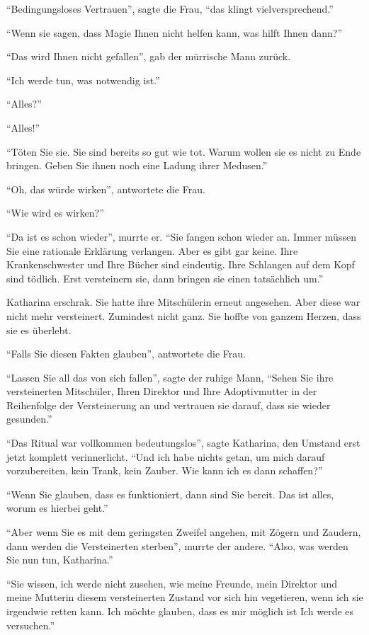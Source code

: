 \enquote{Bedingungsloses Vertrauen}, sagte die Frau, \enquote{das klingt vielversprechend.}

\enquote{Wenn sie sagen, dass Magie Ihnen nicht helfen kann, was hilft Ihnen dann?}

\enquote{Das wird Ihnen nicht gefallen}, gab der mürrische Mann zurück.

\enquote{Ich werde tun, was notwendig ist.}

\enquote{Alles?}

\enquote{Alles!}

\enquote{Töten Sie sie. Sie sind bereits so gut wie tot. Warum wollen sie es nicht zu Ende bringen. Geben Sie ihnen noch eine Ladung ihrer Medusen.}

\enquote{Oh, das würde wirken}, antwortete die Frau.

\enquote{Wie wird es wirken?}

\enquote{Da ist es schon wieder}, murrte er. \enquote{Sie fangen schon wieder an. Immer müssen Sie eine rationale Erklärung verlangen. Aber es gibt gar keine. Ihre Krankenschwester und Ihre Bücher sind eindeutig. Ihre Schlangen auf dem Kopf sind tödlich. Erst versteinern sie, dann bringen sie einen tatsächlich um.}

Katharina erschrak. Sie hatte ihre Mitschülerin erneut angesehen. Aber diese war nicht mehr versteinert. Zumindest nicht ganz. Sie hoffte von ganzem Herzen, dass sie es überlebt.

\enquote{Falls Sie diesen Fakten glauben}, antwortete die Frau.

\enquote{Lassen Sie all das von sich fallen}, sagte der ruhige Mann, \enquote{Sehen Sie ihre versteinerten Mitschüler, Ihren Direktor und Ihre Adoptivmutter in der Reihenfolge der Versteinerung an und vertrauen sie darauf, dass sie wieder gesunden.}

\enquote{Das Ritual war vollkommen bedeutungslos}, sagte Katharina, den Umstand erst jetzt komplett verinnerlicht. \enquote{Und ich habe nichts getan, um mich darauf vorzubereiten, kein Trank, kein Zauber. Wie kann ich es dann schaffen?}

\enquote{Wenn Sie glauben, dass es funktioniert, dann sind Sie bereit. Das ist alles, worum es hierbei geht.}

\enquote{Aber wenn Sie es mit dem geringsten Zweifel angehen, mit Zögern und Zaudern, dann werden die Versteinerten sterben}, murrte der andere. \enquote{\gst Also, was werden Sie nun tun, Katharina.}

\enquote{Sie wissen, ich werde nicht zusehen, wie meine Freunde, mein Direktor und meine Mutter\abs in diesem versteinerten Zustand vor sich hin vegetieren, wenn ich sie irgendwie retten kann. Ich möchte glauben, dass es mir möglich ist \gst Ich werde es versuchen.}


